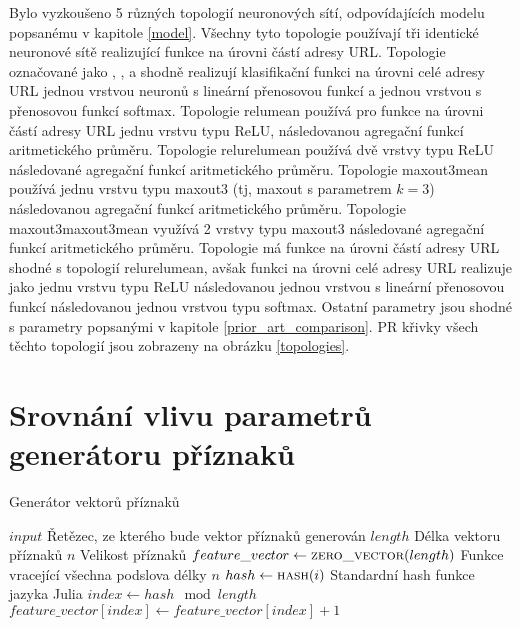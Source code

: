 Bylo vyzkoušeno 5 různých topologií neuronových sítí, odpovídajících modelu popsanému v kapitole \ref{model}. Všechny tyto topologie používají tři identické neuronové sítě realizující funkce na úrovni částí adresy URL. Topologie označované jako , ,  a  shodně realizují klasifikační funkci na úrovni celé adresy URL jednou vrstvou neuronů s lineární přenosovou funkcí a jednou vrstvou s přenosovou funkcí softmax. Topologie relumean používá pro funkce na úrovni částí adresy URL jednu vrstvu typu ReLU, následovanou agregační funkcí aritmetického průměru. Topologie relurelumean používá dvě vrstvy typu ReLU následované agregační funkcí aritmetického průměru. Topologie maxout3mean používá jednu vrstvu typu maxout3 (tj, maxout s parametrem \( k = 3 \)) následovanou agregační funkcí aritmetického průměru. Topologie maxout3maxout3mean využívá 2 vrstvy typu maxout3 následované agregační funkcí aritmetického průměru. Topologie  má funkce na úrovni částí adresy URL shodné s topologií relurelumean, avšak funkci na úrovni celé adresy URL realizuje jako jednu vrstvu typu ReLU následovanou jednou vrstvou s lineární přenosovou funkcí následovanou jednou vrstvou typu softmax. Ostatní parametry jsou shodné s parametry popsanými v kapitole \ref{prior_art_comparison}. PR křivky všech těchto topologií jsou zobrazeny na obrázku \ref{topologies}. 


\section{Srovnání vlivu parametrů generátoru příznaků}

\begin{algorithm}
	\caption{Generátor vektorů příznaků}
	\label{feature_generator}
	\begin{algorithmic}
		\Require $ input $ \Comment Řetězec, ze kterého bude vektor příznaků generován
		\Require $ length $ \Comment Délka vektoru příznaků
		\Require $ n $ \Comment Velikost příznaků
		\Statex
		\State $ feature\_vector \gets \Call{zero\_vector}{length} $
		 \Comment Funkce vracející všechna podslova délky $ n $
			\State $ hash \gets \Call{hash}{i} $ \Comment Standardní hash funkce jazyka Julia
			\State $ index \gets hash \mod length $
			\State $ feature\_vector \left[ index \right] \gets feature\_vector \left[ index \right] + 1 $
		\EndFor
	\end{algorithmic}
\end{algorithm}

